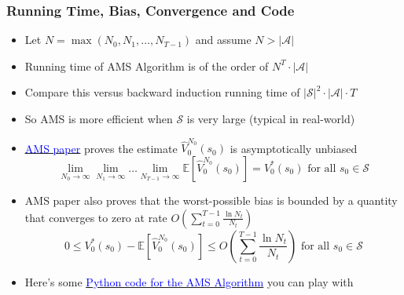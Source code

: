 \documentclass[handout]{beamer}
\begin{document}
\begin{frame}
\frametitle{Running Time, Bias, Convergence and Code}
\pause
\begin{itemize}[<+->]
\item Let $N = \max{(N_0, N_1, \ldots, N_{T-1})}$ and assume $N > |\mathcal{A}|$
\item Running time of AMS Algorithm is of the order of $N^T \cdot |\mathcal{A}|$
\item Compare this versus backward induction running time of $|\mathcal{S}|^2 \cdot |\mathcal{A}| \cdot T$
\item So AMS is more efficient when $\mathcal{S}$ is very large (typical in real-world)
\item \href{https://pdfs.semanticscholar.org/a378/b2895a3e3f6a19cdff1a0ad404b301b5545f.pdf}{\underline{\textcolor{blue}{AMS paper}}} proves the estimate $\hat{V}_0^{N_0}(s_0)$ is asymptotically unbiased
$$\lim_{N_0\rightarrow \infty} \lim_{N_1\rightarrow \infty} \ldots \lim_{N_{T-1}\rightarrow \infty} \mathbb{E}[\hat{V}_0^{N_0}(s_0)] = V_0^*(s_0) \mbox{ for all } s_0 \in \mathcal{S}$$
\item AMS paper also proves that the worst-possible bias is bounded by a quantity that converges to zero at rate $O(\sum_{t=0}^{T-1} \frac {\ln N_t} {N_t})$
$$0 \leq V_0^*(s_0) - \mathbb{E}[\hat{V}_0^{N_0}(s_0)] \leq O(\sum_{t=0}^{T-1} \frac {\ln N_t} {N_t}) \mbox{ for all } s_0 \in \mathcal{S}$$
\item Here's some \href{https://github.com/coverdrive/MDP-DP-RL/blob/master/src/algorithms/ams.py}{\underline{\textcolor{blue}{Python code for the AMS Algorithm}}} you can play with
\end{itemize}
\end{frame}
\end{document}
